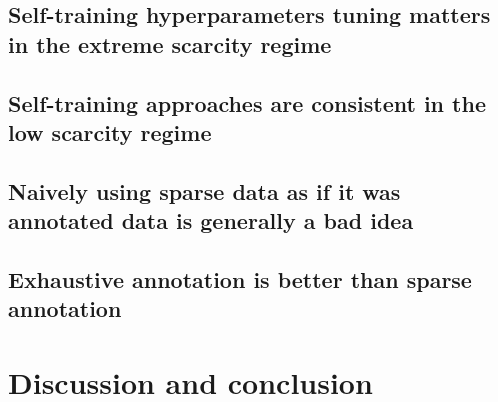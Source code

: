 \subsection{Self-training hyperparameters tuning matters in the extreme scarcity regime}

\subsection{Self-training approaches are consistent in the low scarcity regime}

\subsection{Naively using sparse data as if it was annotated data is generally a bad idea}

\subsection{Exhaustive annotation is better than sparse annotation }



\section{Discussion and conclusion}

\parencite{haridas2015interactive, petit2018handling, petit2021iterative}